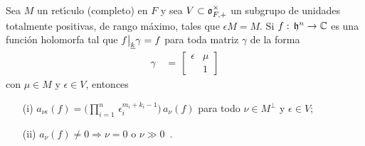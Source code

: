 \begin{teoPrincipioDeKoecher}\label{thm:principiodekoecher}
	Sea $M$ un ret\'{\i}culo (completo) en $F$ y sea
	$V\subset\mathfrak{o}_{F,+}^{\times}$ un subgrupo de unidades totalmente
	positivas, de rango m\'{a}ximo, tales que $\epsilon M=M$. Si
	$f:\,\mathfrak{h}^{n}\rightarrow\mathbb{C}$ es una funci\'{o}n holomorfa tal que
	$f\big|_{\underline{k}}{\gamma}=f$ para toda matriz $\gamma$ de
	la forma
	\begin{align*}
		\gamma & \,=\,\begin{bmatrix} \epsilon & \mu \\
					& 1 \end{bmatrix}
	\end{align*}
	con $\mu\in M$ y $\epsilon\in V$, entonces
	\begin{itemize}
		\item[(i)]
			\begin{math}
				a_{\nu\epsilon}(f) =\big(\prod_{i=1}^{n}\,
					\epsilon_{i}^{m_{i}+k_{i}-1}\big)\,
					a_{\nu}(f)
			\end{math}
			para todo $\nu\in M^{\perp}$ y $\epsilon\in V$;
		\item[(ii)]
			\begin{math}
				a_{\nu}(f)\not =0\Rightarrow\nu = 0\text{ o }
					\nu\gg 0
			\end{math}~.
	\end{itemize}
\end{teoPrincipioDeKoecher}

